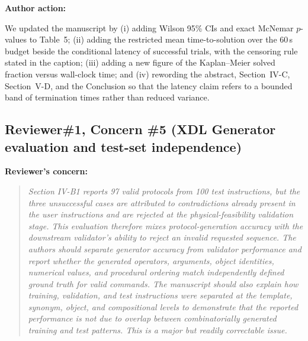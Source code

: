 \documentclass[11pt]{article}
\newif\ifshowstatus
\newcommand{\statusline}[2]{\ifshowstatus\par\noindent\textcolor{status#1}{\textbf{Status: \MakeUppercase{#1}.} #2}\par\smallskip\fi}
\newenvironment{concern}[3][pending]{\subsection*{\ifshowstatus\textcolor{status#1}{#2}\else#2\fi}\statusline{#1}{#3}\textbf{Reviewer's concern:}\begin{quote}\itshape}{\end{quote}}
\newenvironment{action}{\textbf{Author action:}\par\smallskip}{\par\bigskip\noindent\hrulefill\par\bigskip}
\begin{document}
\begin{action}
We updated the manuscript by
(i) adding Wilson 95\% CIs and exact McNemar $p$-values to Table~5;
(ii) adding the restricted mean time-to-solution over the 60\,s budget beside the conditional latency of successful trials, with the censoring rule stated in the caption;
(iii) adding a new figure of the Kaplan--Meier solved fraction versus wall-clock time;
and (iv) rewording the abstract, Section~IV-C, Section~V-D, and the Conclusion so that the latency claim refers to a bounded band of termination times rather than reduced variance.
\end{action}

\begin{concern}[pending]{Reviewer\#1, Concern \#5 (XDL Generator evaluation and test-set independence)}{Needs B3 (reference XDL written blind, field-level scoring) and B4 (split confirmed from dataset scripts).}
Section IV-B1 reports 97 valid protocols from 100 test instructions, but the three unsuccessful cases are attributed to contradictions already present in the user instructions and are rejected at the physical-feasibility validation stage.
This evaluation therefore mixes protocol-generation accuracy with the downstream validator's ability to reject an invalid requested sequence.
The authors should separate generator accuracy from validator performance and report whether the generated operators, arguments, object identities, numerical values, and procedural ordering match independently defined ground truth for valid commands.
The manuscript should also explain how training, validation, and test instructions were separated at the template, synonym, object, and compositional levels to demonstrate that the reported performance is not due to overlap between combinatorially generated training and test patterns.
This is a major but readily correctable issue.
\end{concern}
\end{document}
